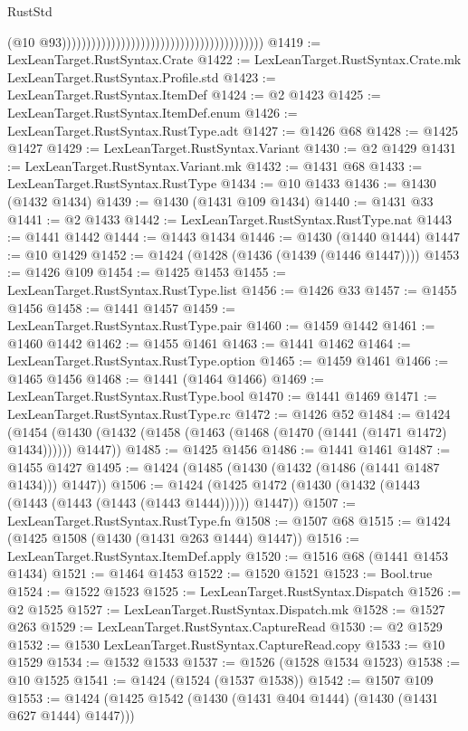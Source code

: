 \begin{lexlean}{RustStd}
\begin{coremodule}
                                                                                    (@10
                                                                                      @93)))))))))))))))))))))))))))))))))))))))))
@1419 := LexLeanTarget.RustSyntax.Crate
@1422 := LexLeanTarget.RustSyntax.Crate.mk LexLeanTarget.RustSyntax.Profile.std
@1423 := LexLeanTarget.RustSyntax.ItemDef
@1424 := @2 @1423
@1425 := LexLeanTarget.RustSyntax.ItemDef.enum
@1426 := LexLeanTarget.RustSyntax.RustType.adt
@1427 := @1426 @68
@1428 := @1425 @1427
@1429 := LexLeanTarget.RustSyntax.Variant
@1430 := @2 @1429
@1431 := LexLeanTarget.RustSyntax.Variant.mk
@1432 := @1431 @68
@1433 := LexLeanTarget.RustSyntax.RustType
@1434 := @10 @1433
@1436 := @1430 (@1432 @1434)
@1439 := @1430 (@1431 @109 @1434)
@1440 := @1431 @33
@1441 := @2 @1433
@1442 := LexLeanTarget.RustSyntax.RustType.nat
@1443 := @1441 @1442
@1444 := @1443 @1434
@1446 := @1430 (@1440 @1444)
@1447 := @10 @1429
@1452 := @1424 (@1428 (@1436 (@1439 (@1446 @1447))))
@1453 := @1426 @109
@1454 := @1425 @1453
@1455 := LexLeanTarget.RustSyntax.RustType.list
@1456 := @1426 @33
@1457 := @1455 @1456
@1458 := @1441 @1457
@1459 := LexLeanTarget.RustSyntax.RustType.pair
@1460 := @1459 @1442
@1461 := @1460 @1442
@1462 := @1455 @1461
@1463 := @1441 @1462
@1464 := LexLeanTarget.RustSyntax.RustType.option
@1465 := @1459 @1461
@1466 := @1465 @1456
@1468 := @1441 (@1464 @1466)
@1469 := LexLeanTarget.RustSyntax.RustType.bool
@1470 := @1441 @1469
@1471 := LexLeanTarget.RustSyntax.RustType.rc
@1472 := @1426 @52
@1484 := @1424
    (@1454 (@1430 (@1432 (@1458 (@1463 (@1468 (@1470 (@1441 (@1471 @1472) @1434)))))) @1447))
@1485 := @1425 @1456
@1486 := @1441 @1461
@1487 := @1455 @1427
@1495 := @1424 (@1485 (@1430 (@1432 (@1486 (@1441 @1487 @1434))) @1447))
@1506 := @1424 (@1425 @1472 (@1430 (@1432 (@1443 (@1443 (@1443 (@1443 (@1443 @1444)))))) @1447))
@1507 := LexLeanTarget.RustSyntax.RustType.fn
@1508 := @1507 @68
@1515 := @1424 (@1425 @1508 (@1430 (@1431 @263 @1444) @1447))
@1516 := LexLeanTarget.RustSyntax.ItemDef.apply
@1520 := @1516 @68 (@1441 @1453 @1434)
@1521 := @1464 @1453
@1522 := @1520 @1521
@1523 := Bool.true
@1524 := @1522 @1523
@1525 := LexLeanTarget.RustSyntax.Dispatch
@1526 := @2 @1525
@1527 := LexLeanTarget.RustSyntax.Dispatch.mk
@1528 := @1527 @263
@1529 := LexLeanTarget.RustSyntax.CaptureRead
@1530 := @2 @1529
@1532 := @1530 LexLeanTarget.RustSyntax.CaptureRead.copy
@1533 := @10 @1529
@1534 := @1532 @1533
@1537 := @1526 (@1528 @1534 @1523)
@1538 := @10 @1525
@1541 := @1424 (@1524 (@1537 @1538))
@1542 := @1507 @109
@1553 := @1424 (@1425 @1542 (@1430 (@1431 @404 @1444) (@1430 (@1431 @627 @1444) @1447)))

\end{coremodule}
\end{lexlean}

